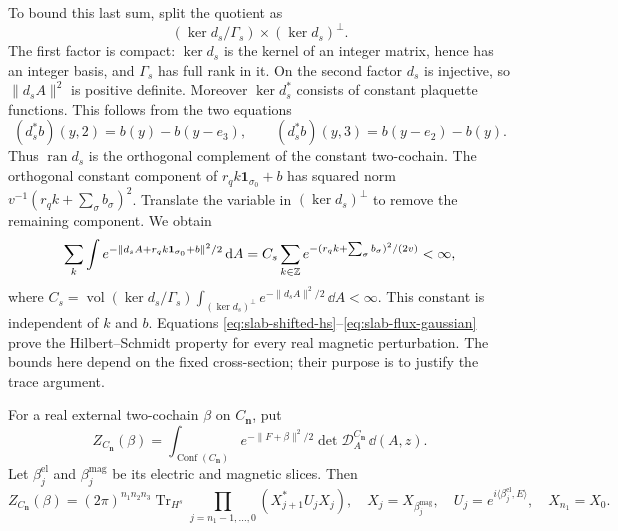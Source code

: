 To bound this last sum, split the quotient as
\[
 (\ker d_s/\Gamma_s)\times(\ker d_s)^\perp.
\]
The first factor is compact: $\ker d_s$ is the kernel of an integer
matrix, hence has an integer basis, and $\Gamma_s$ has full rank in
it. On the second factor $d_s$ is injective, so
$\|d_sA\|^2$ is positive definite. Moreover
$\ker d_s^*$ consists of constant plaquette functions. This follows
from the two equations
\[
 (d_s^*b)(y,2)=b(y)-b(y-e_3),\qquad
 (d_s^*b)(y,3)=b(y-e_2)-b(y).
\]
Thus $\operatorname{ran}d_s$ is the orthogonal complement of the
constant two-cochain. The orthogonal constant component of
$r_qk\mathbf1_{\sigma_0}+b$ has squared norm
$v^{-1}(r_qk+\sum_\sigma b_\sigma)^2$. Translate the variable in
$(\ker d_s)^\perp$ to remove the remaining component. We obtain
\begin{equation}\label{eq:slab-flux-gaussian}
 \sum_k\int e^{-\|d_sA+r_qk\mathbf1_{\sigma_0}+b\|^2/2}\,\mathrm d A
    =C_s\sum_{k\in\mathbb Z}
               e^{-(r_qk+\sum_\sigma b_\sigma)^2/(2v)}<\infty,
\end{equation}
where
$C_s=\operatorname{vol}(\ker d_s/\Gamma_s)
\int_{(\ker d_s)^\perp}e^{-\|d_sA\|^2/2}\,\dd A<\infty$.
This constant is independent of $k$ and $b$. Equations
\eqref{eq:slab-shifted-hs}--\eqref{eq:slab-flux-gaussian} prove the
Hilbert--Schmidt property for every real magnetic perturbation. The
bounds here depend on the fixed cross-section; their purpose is to
justify the trace argument.

For a real external two-cochain $\beta$ on $C_{\mathbf n}$, put
\begin{equation}\label{eq:slab-external-partition}
 Z_{C_{\mathbf n}}(\beta)=\int_{\operatorname{Conf}(C_{\mathbf n})}
          e^{-\|F+\beta\|^2/2}\det \mathcal D_A^{C_{\mathbf n}}\,\dd(A,z).
\end{equation}
Let $\beta_j^{\mathrm{el}}$ and $\beta_j^{\mathrm{mag}}$ be its
electric and magnetic slices. Then
\begin{equation}\label{eq:slab-external-trace}
 Z_{C_{\mathbf n}}(\beta)=(2\pi)^{n_1n_2n_3}
       \operatorname{Tr}_{H^s}\prod_{j=n_1-1,\ldots,0}
            (X_{j+1}^*U_jX_j),
 \quad X_j=X_{\beta_j^{\mathrm{mag}}},\quad
 U_j=e^{i\langle\beta_j^{\mathrm{el}},E\rangle},
 \quad X_{n_1}=X_0.
\end{equation}


